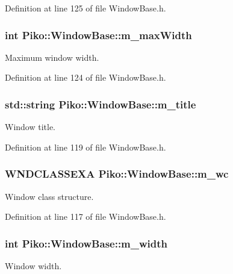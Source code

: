 Definition at line 125 of file Window\-Base.\-h.

\hypertarget{class_piko_1_1_window_base_a98906296f0425ce5dbb4e1a87d3e47b0}{
\subsubsection[{m\-\_\-max\-Width}]{\setlength{\rightskip}{0pt plus 5cm}int Piko\-::\-Window\-Base\-::m\-\_\-max\-Width\hspace{0.3cm}{\ttfamily [private]}}}\label{d5/d35/class_piko_1_1_window_base_a98906296f0425ce5dbb4e1a87d3e47b0}
Maximum window width. 

Definition at line 124 of file Window\-Base.\-h.

\hypertarget{class_piko_1_1_window_base_a7ceb6bf3578cee3fea335d2fef70d4b2}{
\subsubsection[{m\-\_\-title}]{\setlength{\rightskip}{0pt plus 5cm}std\-::string Piko\-::\-Window\-Base\-::m\-\_\-title\hspace{0.3cm}{\ttfamily [private]}}}\label{d5/d35/class_piko_1_1_window_base_a7ceb6bf3578cee3fea335d2fef70d4b2}
Window title. 

Definition at line 119 of file Window\-Base.\-h.

\hypertarget{class_piko_1_1_window_base_aa307fb2f2593554bff1338beda280d91}{
\subsubsection[{m\-\_\-wc}]{\setlength{\rightskip}{0pt plus 5cm}W\-N\-D\-C\-L\-A\-S\-S\-E\-X\-A Piko\-::\-Window\-Base\-::m\-\_\-wc\hspace{0.3cm}{\ttfamily [private]}}}\label{d5/d35/class_piko_1_1_window_base_aa307fb2f2593554bff1338beda280d91}
Window class structure. 

Definition at line 117 of file Window\-Base.\-h.

\hypertarget{class_piko_1_1_window_base_aaa2d391163ae4db0a2bb7ff3cb241475}{
\subsubsection[{m\-\_\-width}]{\setlength{\rightskip}{0pt plus 5cm}int Piko\-::\-Window\-Base\-::m\-\_\-width\hspace{0.3cm}{\ttfamily [private]}}}\label{d5/d35/class_piko_1_1_window_base_aaa2d391163ae4db0a2bb7ff3cb241475}
Window width. 

